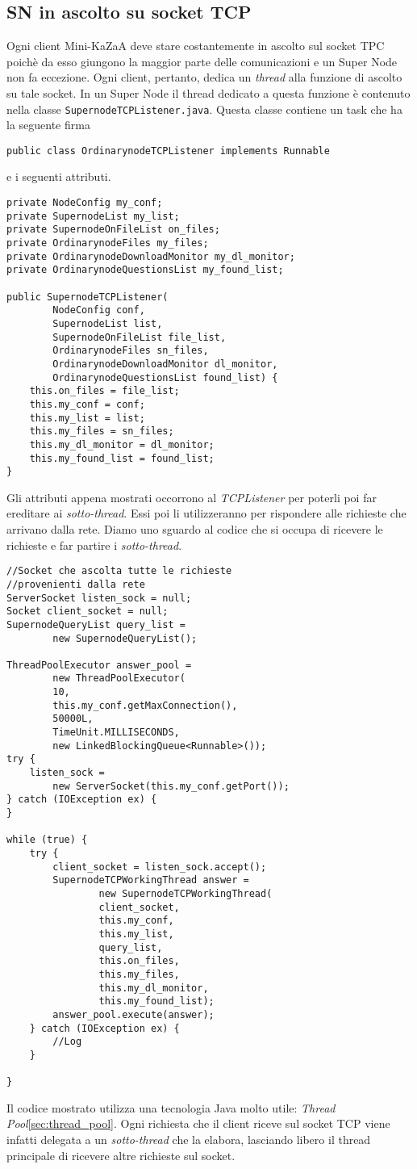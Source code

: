 \subsection{SN in ascolto su socket TCP}
Ogni client Mini-KaZaA deve stare costantemente in ascolto sul socket TPC poichè da esso giungono la maggior parte delle comunicazioni e un Super Node non fa eccezione.
Ogni client, pertanto, dedica un \emph{thread} alla funzione di ascolto su tale socket.
In un Super Node il thread dedicato a questa funzione è contenuto nella classe \verb|SupernodeTCPListener.java|.
Questa classe contiene un task che ha la seguente firma
\begin{verbatim}
public class OrdinarynodeTCPListener implements Runnable
\end{verbatim}
e i seguenti attributi.
\begin{lstlisting}
private NodeConfig my_conf;
private SupernodeList my_list;
private SupernodeOnFileList on_files;
private OrdinarynodeFiles my_files;
private OrdinarynodeDownloadMonitor my_dl_monitor;
private OrdinarynodeQuestionsList my_found_list;

public SupernodeTCPListener(
		NodeConfig conf,
		SupernodeList list,
		SupernodeOnFileList file_list,
		OrdinarynodeFiles sn_files,
		OrdinarynodeDownloadMonitor dl_monitor,
		OrdinarynodeQuestionsList found_list) {
	this.on_files = file_list;
	this.my_conf = conf;
	this.my_list = list;
	this.my_files = sn_files;
	this.my_dl_monitor = dl_monitor;
	this.my_found_list = found_list;
}
\end{lstlisting}
Gli attributi appena mostrati occorrono al \emph{TCPListener} per poterli poi far ereditare ai \emph{sotto-thread}. Essi poi li utilizzeranno per rispondere alle richieste che arrivano dalla rete.
Diamo uno sguardo al codice che si occupa di ricevere le richieste e far partire i \emph{sotto-thread}.

\begin{lstlisting}
//Socket che ascolta tutte le richieste
//provenienti dalla rete
ServerSocket listen_sock = null;
Socket client_socket = null;
SupernodeQueryList query_list = 
		new SupernodeQueryList();

ThreadPoolExecutor answer_pool = 
		new ThreadPoolExecutor(
		10,
		this.my_conf.getMaxConnection(),
		50000L,
		TimeUnit.MILLISECONDS,
		new LinkedBlockingQueue<Runnable>());
try {
	listen_sock = 
		new ServerSocket(this.my_conf.getPort());
} catch (IOException ex) {
}

while (true) {
	try {
		client_socket = listen_sock.accept();
		SupernodeTCPWorkingThread answer = 
				new SupernodeTCPWorkingThread(
				client_socket,
				this.my_conf,
				this.my_list,
				query_list, 
				this.on_files,
				this.my_files,
				this.my_dl_monitor,
				this.my_found_list);
		answer_pool.execute(answer);
	} catch (IOException ex) {
		//Log
	}

}
\end{lstlisting}

Il codice mostrato utilizza una tecnologia Java molto utile: \emph{Thread Pool}\ref{sec:thread_pool}.
Ogni richiesta che il client riceve sul socket TCP viene infatti delegata a un \emph{sotto-thread} che la elabora, lasciando libero il thread principale di ricevere altre richieste sul socket.



